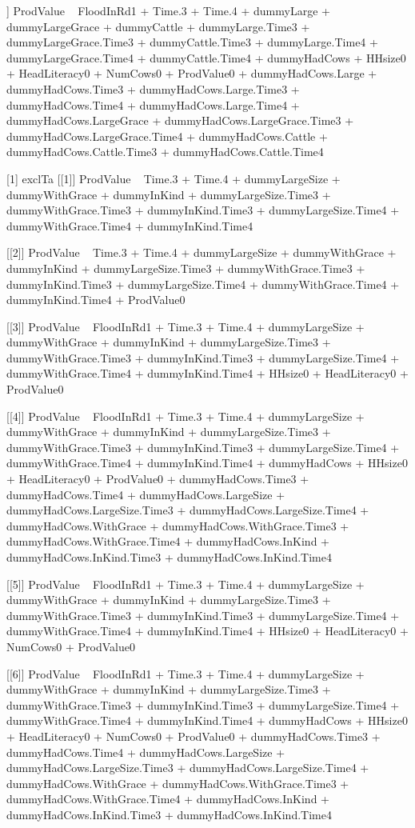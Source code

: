\begin{Schunk}
\begin{Soutput}
[[6]]
ProdValue ~ FloodInRd1 + Time.3 + Time.4 + dummyLarge + dummyLargeGrace + 
    dummyCattle + dummyLarge.Time3 + dummyLargeGrace.Time3 + 
    dummyCattle.Time3 + dummyLarge.Time4 + dummyLargeGrace.Time4 + 
    dummyCattle.Time4 + dummyHadCows + HHsize0 + HeadLiteracy0 + 
    NumCows0 + ProdValue0 + dummyHadCows.Large + dummyHadCows.Time3 + 
    dummyHadCows.Large.Time3 + dummyHadCows.Time4 + dummyHadCows.Large.Time4 + 
    dummyHadCows.LargeGrace + dummyHadCows.LargeGrace.Time3 + 
    dummyHadCows.LargeGrace.Time4 + dummyHadCows.Cattle + dummyHadCows.Cattle.Time3 + 
    dummyHadCows.Cattle.Time4

[1] exclTa
[[1]]
ProdValue ~ Time.3 + Time.4 + dummyLargeSize + dummyWithGrace + 
    dummyInKind + dummyLargeSize.Time3 + dummyWithGrace.Time3 + 
    dummyInKind.Time3 + dummyLargeSize.Time4 + dummyWithGrace.Time4 + 
    dummyInKind.Time4

[[2]]
ProdValue ~ Time.3 + Time.4 + dummyLargeSize + dummyWithGrace + 
    dummyInKind + dummyLargeSize.Time3 + dummyWithGrace.Time3 + 
    dummyInKind.Time3 + dummyLargeSize.Time4 + dummyWithGrace.Time4 + 
    dummyInKind.Time4 + ProdValue0

[[3]]
ProdValue ~ FloodInRd1 + Time.3 + Time.4 + dummyLargeSize + dummyWithGrace + 
    dummyInKind + dummyLargeSize.Time3 + dummyWithGrace.Time3 + 
    dummyInKind.Time3 + dummyLargeSize.Time4 + dummyWithGrace.Time4 + 
    dummyInKind.Time4 + HHsize0 + HeadLiteracy0 + ProdValue0

[[4]]
ProdValue ~ FloodInRd1 + Time.3 + Time.4 + dummyLargeSize + dummyWithGrace + 
    dummyInKind + dummyLargeSize.Time3 + dummyWithGrace.Time3 + 
    dummyInKind.Time3 + dummyLargeSize.Time4 + dummyWithGrace.Time4 + 
    dummyInKind.Time4 + dummyHadCows + HHsize0 + HeadLiteracy0 + 
    ProdValue0 + dummyHadCows.Time3 + dummyHadCows.Time4 + dummyHadCows.LargeSize + 
    dummyHadCows.LargeSize.Time3 + dummyHadCows.LargeSize.Time4 + 
    dummyHadCows.WithGrace + dummyHadCows.WithGrace.Time3 + dummyHadCows.WithGrace.Time4 + 
    dummyHadCows.InKind + dummyHadCows.InKind.Time3 + dummyHadCows.InKind.Time4

[[5]]
ProdValue ~ FloodInRd1 + Time.3 + Time.4 + dummyLargeSize + dummyWithGrace + 
    dummyInKind + dummyLargeSize.Time3 + dummyWithGrace.Time3 + 
    dummyInKind.Time3 + dummyLargeSize.Time4 + dummyWithGrace.Time4 + 
    dummyInKind.Time4 + HHsize0 + HeadLiteracy0 + NumCows0 + 
    ProdValue0

[[6]]
ProdValue ~ FloodInRd1 + Time.3 + Time.4 + dummyLargeSize + dummyWithGrace + 
    dummyInKind + dummyLargeSize.Time3 + dummyWithGrace.Time3 + 
    dummyInKind.Time3 + dummyLargeSize.Time4 + dummyWithGrace.Time4 + 
    dummyInKind.Time4 + dummyHadCows + HHsize0 + HeadLiteracy0 + 
    NumCows0 + ProdValue0 + dummyHadCows.Time3 + dummyHadCows.Time4 + 
    dummyHadCows.LargeSize + dummyHadCows.LargeSize.Time3 + dummyHadCows.LargeSize.Time4 + 
    dummyHadCows.WithGrace + dummyHadCows.WithGrace.Time3 + dummyHadCows.WithGrace.Time4 + 
    dummyHadCows.InKind + dummyHadCows.InKind.Time3 + dummyHadCows.InKind.Time4


\end{Soutput}
\end{Schunk}
